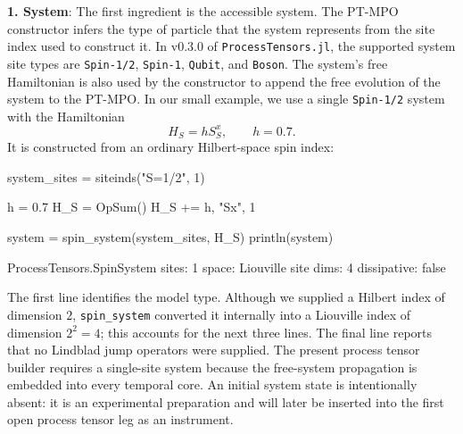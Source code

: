 \textbf{1.
System}: The first ingredient is the accessible system.
The PT-MPO constructor infers the type of particle that the system represents from the site index used to construct it.
In v0.3.0 of \texttt{ProcessTensors.jl}, the supported system site types are \texttt{Spin-1/2}, \texttt{Spin-1}, \texttt{Qubit}, and \texttt{Boson}.
The system's free Hamiltonian is also used by the constructor to append the free evolution of the system to the PT-MPO.
In our small example, we use a single \texttt{Spin-1/2} system with the Hamiltonian
%
\begin{equation}
    H_S=hS_S^x, \qquad h=0.7.
    \label{eq:dense-example-system-hamiltonian}
\end{equation}
%
It is constructed from an ordinary Hilbert-space spin index:
%
\begin{julialistingpair}[
    caption={System Hamiltonian and \texttt{SpinSystem} constructor.}, label={lst:pt-ingredients-system},
    ]
%
    \begin{juliacode}[paired]
system_sites = siteinds("S=1/2", 1)

h = 0.7
H_S = OpSum()
H_S += h, "Sx", 1

system = spin_system(system_sites, H_S)
println(system)
    \end{juliacode}
%
    \begin{juliaoutput}[paired]
ProcessTensors.SpinSystem
  sites: 1
  space: Liouville
  site dims: 4
  dissipative: false
    \end{juliaoutput}
%
\end{julialistingpair}
%
The first line identifies the model type.
Although we supplied a Hilbert index of dimension \(2\), \texttt{spin\_system} converted it internally into a Liouville index of dimension \(2^2=4\); this accounts for the next three lines.
The final line reports that no Lindblad jump operators were supplied.
The present process tensor builder requires a single-site system because the free-system propagation is embedded into every temporal core.
An initial system state is intentionally absent: it is an experimental preparation and will later be inserted into the first open process tensor leg as an instrument.

